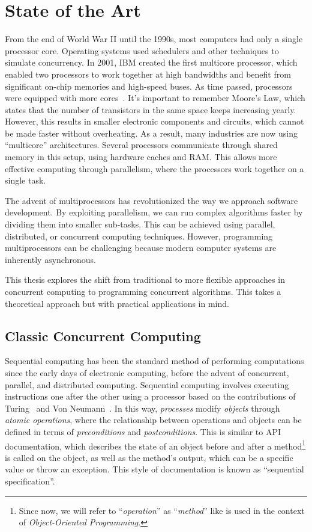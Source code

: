 \chapter{\label{chapter:2_State_of_art}State of the Art}

From the end of World War II until the 1990s, most computers had only a single processor core. Operating systems used schedulers and other techniques to simulate concurrency. In 2001, IBM created the first multicore processor, which enabled two processors to work together at high bandwidths and benefit from significant on-chip memories and high-speed buses. As time passed, processors were equipped with more cores~\cite{ibmIBM100Power}. It's important to remember Moore's Law, which states that the number of transistors in the same space keeps increasing yearly. However, this results in smaller electronic components and circuits, which cannot be made faster without overheating. As a result, many industries are now using ``multicore'' architectures. Several processors communicate through shared memory in this setup, using hardware caches and RAM. This allows more effective computing through parallelism, where the processors work together on a single task\cite{DBLP_books_daglib_0020056}.

The advent of multiprocessors has revolutionized the way we approach software development. By exploiting parallelism, we can run complex algorithms faster by dividing them into smaller sub-tasks. This can be achieved using parallel, distributed, or concurrent computing techniques. However, programming multiprocessors can be challenging because modern computer systems are inherently asynchronous.

This thesis explores the shift from traditional to more flexible approaches in concurrent computing to programming concurrent algorithms. This takes a theoretical approach but with practical applications in mind.

\section{\label{section:classic-concurrent}Classic Concurrent Computing}

Sequential computing has been the standard method of performing computations since the early days of electronic computing, before the advent of concurrent, parallel, and distributed computing. Sequential computing involves executing instructions one after the other using a processor based on the contributions of Turing~\cite{DBLP_journals_x_Turing37} and Von Neumann~\cite{DBLP_journals_annals_Neumann93}. In this way, \textit{processes} modify \textit{objects} through \textit{atomic operations}, where the relationship between operations and objects can be defined in terms of \textit{preconditions} and \textit{postconditions}. This is similar to API documentation, which describes the state of an object before and after a method\footnote{Since now, we will refer to ``\textit{operation}'' as ``\textit{method}'' like is used in the context of \textit{Object-Oriented Programming}.} is called on the object, as well as the method's output, which can be a specific value or throw an exception. This style of documentation is known as ``sequential specification''.

